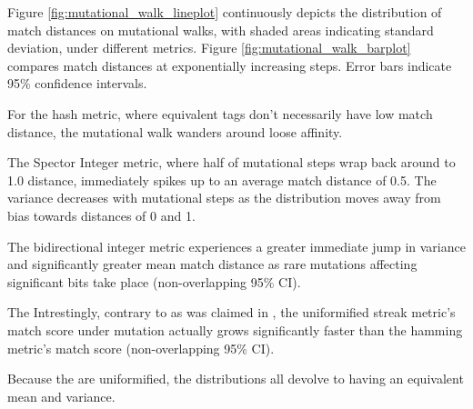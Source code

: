 Figure \ref{fig:mutational_walk_lineplot} continuously depicts the distribution of match distances on mutational walks, with shaded areas indicating standard deviation, under different metrics.
Figure \ref{fig:mutational_walk_barplot} compares match distances at exponentially increasing steps.
Error bars indicate 95\% confidence intervals.

For the hash metric, where equivalent tags don't necessarily have low match distance, the mutational walk wanders around loose affinity.

The Spector Integer metric, where half of mutational steps wrap back around to 1.0 distance, immediately spikes up to an average match distance of 0.5.
The variance decreases with mutational steps as the distribution moves away from bias towards distances of 0 and 1.

The bidirectional integer metric experiences a greater immediate jump in variance and significantly greater mean match distance as rare mutations affecting significant bits take place (non-overlapping 95\% CI).

The
Intrestingly, contrary to as was claimed in \citep{downing2015intelligence}, the uniformified streak metric's match score under mutation actually grows significantly faster than the hamming metric's match score  (non-overlapping 95\% CI).

Because the are uniformified, the distributions all devolve to having an equivalent mean and variance.


